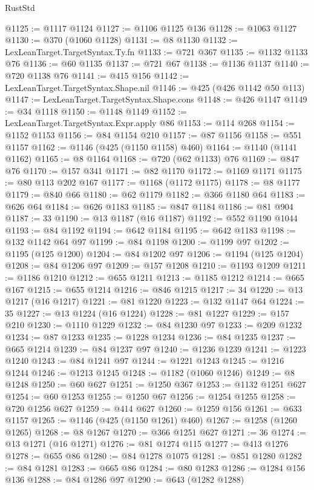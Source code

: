 \begin{lexlean}{RustStd}
\begin{coremodule}
@1125 := @1117 @1124
@1127 := @1106 @1125 @136
@1128 := @1063 @1127
@1130 := @370 (@1060 @1128)
@1131 := @8 @1130
@1132 := LexLeanTarget.TargetSyntax.Ty.fn
@1133 := @721 @367
@1135 := @1132 @1133 @76
@1136 := @60 @1135
@1137 := @721 @67
@1138 := @1136 @1137
@1140 := @720 @1138 @76
@1141 := @415 @156
@1142 := LexLeanTarget.TargetSyntax.Shape.nil
@1146 := @425 (@426 @1142 @50 @113)
@1147 := LexLeanTarget.TargetSyntax.Shape.cons
@1148 := @426 @1147
@1149 := @34 @1118
@1150 := @1148 @1149
@1152 := LexLeanTarget.TargetSyntax.Expr.apply @86
@1153 := @114 @268
@1154 := @1152 @1153
@1156 := @84 @1154 @210
@1157 := @87 @1156
@1158 := @551 @1157
@1162 := @1146 (@425 (@1150 @1158) @460)
@1164 := @1140 (@1141 @1162)
@1165 := @8 @1164
@1168 := @720 (@62 @1133) @76
@1169 := @847 @76
@1170 := @157 @341
@1171 := @82 @1170
@1172 := @1169 @1171
@1175 := @80 @113 @202 @167
@1177 := @1168 (@1172 @1175)
@1178 := @8 @1177
@1179 := @840 @66
@1180 := @62 @1179
@1182 := @366 @1180 @64
@1183 := @626 @64
@1184 := @626 @1183
@1185 := @847 @1184
@1186 := @81 @904
@1187 := 33
@1190 := @13 @1187 (@16 @1187)
@1192 := @552 @1190 @1044
@1193 := @84 @1192
@1194 := @642 @1184
@1195 := @642 @1183
@1198 := @132 @1142 @64 @97
@1199 := @84 @1198
@1200 := @1199 @97
@1202 := @1195 (@125 @1200)
@1204 := @84 @1202 @97
@1206 := @1194 (@125 @1204)
@1208 := @84 @1206 @97
@1209 := @157 @1208
@1210 := @1193 @1209
@1211 := @1186 @1210
@1212 := @655 @1211
@1213 := @1185 @1212
@1214 := @665 @167
@1215 := @655 @1214
@1216 := @846 @1215
@1217 := 34
@1220 := @13 @1217 (@16 @1217)
@1221 := @81 @1220
@1223 := @132 @1147 @64
@1224 := 35
@1227 := @13 @1224 (@16 @1224)
@1228 := @81 @1227
@1229 := @157 @210
@1230 := @1110 @1229
@1232 := @84 @1230 @97
@1233 := @209 @1232
@1234 := @87 @1233
@1235 := @1228 @1234
@1236 := @84 @1235
@1237 := @665 @1214
@1239 := @84 @1237 @97
@1240 := @1236 @1239
@1241 := @1223 @1240
@1243 := @84 @1241 @97
@1244 := @1221 @1243
@1245 := @1216 @1244
@1246 := @1213 @1245
@1248 := @1182 (@1060 @1246)
@1249 := @8 @1248
@1250 := @60 @627
@1251 := @1250 @367
@1253 := @1132 @1251 @627
@1254 := @60 @1253
@1255 := @1250 @67
@1256 := @1254 @1255
@1258 := @720 @1256 @627
@1259 := @414 @627
@1260 := @1259 @156
@1261 := @633 @1157
@1265 := @1146 (@425 (@1150 @1261) @460)
@1267 := @1258 (@1260 @1265)
@1268 := @8 @1267
@1270 := @366 @1251 @627
@1271 := 36
@1274 := @13 @1271 (@16 @1271)
@1276 := @81 @1274 @115
@1277 := @413 @1276
@1278 := @655 @86
@1280 := @84 @1278 @1075
@1281 := @851 @1280
@1282 := @84 @1281
@1283 := @665 @86
@1284 := @80 @1283
@1286 := @1284 @156 @136
@1288 := @84 @1286 @97
@1290 := @643 (@1282 @1288)

\end{coremodule}
\end{lexlean}
